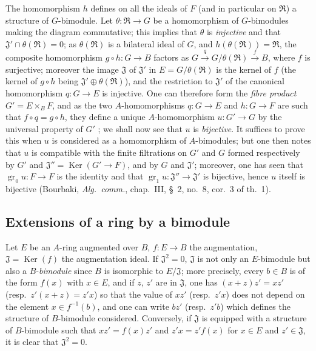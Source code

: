 \begin{env}[18.1.7]
The homomorphism $h$ defines on all the ideals of $F$ (and in particular on $\mathfrak{R}$) a structure of $G$-bimodule.
Let $\theta:\mathfrak{R}\to G$ be a homomorphism of $G$-bimodules making the diagram  commutative; this implies that $\theta$ is \emph{injective} and that $\mathfrak{J}'\cap\theta(\mathfrak{R})=0$; as $\theta(\mathfrak{R})$ is a bilateral ideal of $G$, and $h(\theta(\mathfrak{R}))=\mathfrak{R}$, the composite homomorphism $g\circ h:G\to B$ factors as $G\xrightarrow{q}G/\theta(\mathfrak{R})\xrightarrow{f}B$, where $f$ is surjective; moreover the image $\mathfrak{J}$ of $\mathfrak{J}'$ in $E=G/\theta(\mathfrak{R})$ is the kernel of $f$ (the kernel of $g\circ h$ being $\mathfrak{J}'\oplus\theta(\mathfrak{R})$), and the restriction to $\mathfrak{J}'$ of the canonical homomorphism $q:G\to E$ is injective.
One can therefore form the \emph{fibre product} $G'=E\times_B F$, and as the two $A$-homomorphisms $q:G\to E$ and $h:G\to F$ are such that $f\circ q=g\circ h$, they define a unique $A$-homomorphism $u:G'\to G$ by the universal property of $G'$ ; we shall now see that $u$ is \emph{bijective}.
It suffices to prove this when $u$ is considered as a homomorphism of $A$-bimodules; but one then notes that $u$ is compatible with the finite filtrations on $G'$ and $G$ formed respectively by $G'$ and $\mathfrak{J}''=\operatorname{Ker}(G'\to F)$, and by $G$ and $\mathfrak{J}'$; moreover, one has seen  that $\operatorname{gr}_0 u:F\to F$ is the identity and that $\operatorname{gr}_1 u:\mathfrak{J}''\to\mathfrak{J}'$ is bijective, hence $u$ itself is bijective (Bourbaki, \emph{Alg.\ comm.}, chap.~III, \S~2, no.~8, cor.~3 of th.~1).
\end{env}

\subsection{Extensions of a ring by a bimodule}
\label{subsection:0.18.2}

\begin{env}[18.2.1]
\label{0.18.2.1}
Let $E$ be an $A$-ring augmented over $B$, $f:E\to B$ the augmentation, $\mathfrak{J}=\operatorname{Ker}(f)$ the augmentation ideal.
If $\mathfrak{J}^2=0$, $\mathfrak{J}$ is not only an $E$-bimodule but also a $B$-\emph{bimodule} since $B$ is isomorphic to $E/\mathfrak{J}$; more precisely, every $b\in B$ is of the form $f(x)$ with $x\in E$, and if $z$, $z'$ are in $\mathfrak{J}$, one has $(x+z)z'=xz'$ (resp.\ $z'(x+z)=z'x$) so that the value of $xz'$ (resp.\ $z'x$) does not depend on the element $x\in f^{-1}(b)$, and one can write $bz'$ (resp.\ $z'b$) which defines the structure of $B$-bimodule considered.
Conversely, if $\mathfrak{J}$ is equipped with a structure of $B$-bimodule such that $xz'=f(x)z'$ and $z'x=z'f(x)$ for $x\in E$ and $z'\in\mathfrak{J}$, it is clear that $\mathfrak{J}^2=0$.
\end{env}

